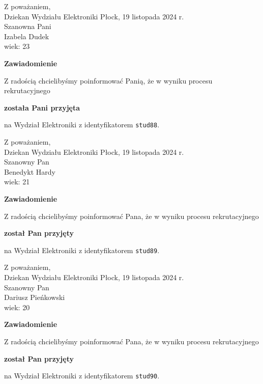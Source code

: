 \documentclass[12pt,a4paper]{article}
\begin{document}
\noindent
Z poważaniem,\\
Dziekan
Wydziału Elektroniki
\newpage
\hfill Płock, 19 listopada 2024 r.\\ 
\noindent 
Szanowna Pani \\
Izabela Dudek \\
wiek: 23

\bigskip

\begin{center}
{\Large\textbf{Zawiadomienie}}
\end{center}
\bigskip
Z radością chcielibyśmy poinformować Panią, że w wyniku procesu rekrutacyjnego
\begin{center}
\textsf{\textbf{została Pani przyjęta}} 
\end{center}
na Wydział Elektroniki z identyfikatorem \verb|stud88|.
\vspace{2cm}

\noindent
Z poważaniem,\\
Dziekan
Wydziału Elektroniki
\newpage
\hfill Płock, 19 listopada 2024 r.\\ 
\noindent 
Szanowny Pan \\
Benedykt Hardy \\
wiek: 21

\bigskip

\begin{center}
{\Large\textbf{Zawiadomienie}}
\end{center}
\bigskip
Z radością chcielibyśmy poinformować Pana, że w wyniku procesu rekrutacyjnego
\begin{center}
\textsf{\textbf{został Pan przyjęty}} 
\end{center}
na Wydział Elektroniki z identyfikatorem \verb|stud89|.
\vspace{2cm}

\noindent
Z poważaniem,\\
Dziekan
Wydziału Elektroniki
\newpage
\hfill Płock, 19 listopada 2024 r.\\ 
\noindent 
Szanowny Pan \\
Dariusz Pieńkowski \\
wiek: 20

\bigskip

\begin{center}
{\Large\textbf{Zawiadomienie}}
\end{center}
\bigskip
Z radością chcielibyśmy poinformować Pana, że w wyniku procesu rekrutacyjnego
\begin{center}
\textsf{\textbf{został Pan przyjęty}} 
\end{center}
na Wydział Elektroniki z identyfikatorem \verb|stud90|.
\vspace{2cm}
\end{document}
